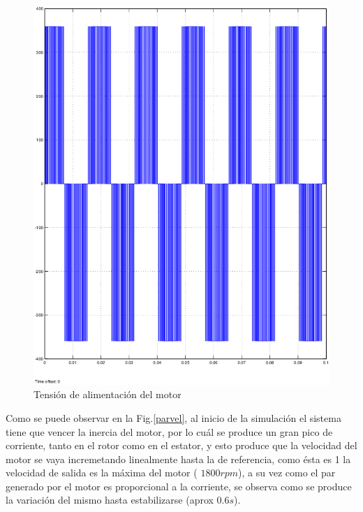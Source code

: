 \documentclass[11pt, a4paper]{article}
\begin{document}
\begin{figure}[H]
\centering
\includegraphics[scale=0.5]{imagenes/tension}
\caption{Tensión de alimentación del motor}
\label{tension}
\end{figure}


Como se puede observar en la Fig.\ref{parvel}, al inicio de la simulación el sistema tiene que vencer la inercia del motor, por lo cuál  se produce un gran pico de corriente, tanto en el rotor como en el estator, y esto produce que la velocidad del motor se vaya incremetando linealmente hasta la de referencia, como ésta es 1 la velocidad de salida es la máxima del motor ( $1800 rpm$), a su vez como el par generado por el motor es proporcional a la corriente, se observa como se produce la variación del mismo hasta estabilizarse (aprox $0.6 s$).
\end{document}
